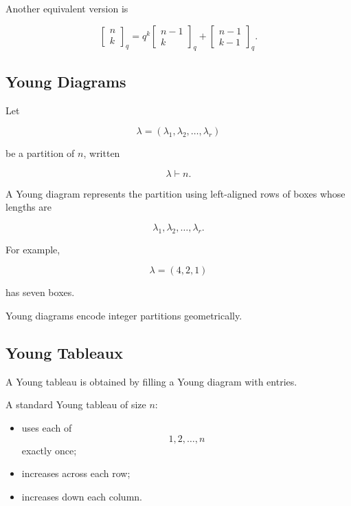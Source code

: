 Another equivalent version is

\[
\boxed{
\begin{bmatrix}
n\\
k
\end{bmatrix}_q
=
q^k
\begin{bmatrix}
n-1\\
k
\end{bmatrix}_q
+
\begin{bmatrix}
n-1\\
k-1
\end{bmatrix}_q.
}
\]

\subsection{Young Diagrams}
\label{subsec:young-diagrams-algebraic}

Let

\[
\lambda
=
(\lambda_1,\lambda_2,\ldots,\lambda_r)
\]

be a partition of \(n\), written

\[
\lambda\vdash n.
\]

A Young diagram represents the partition using left-aligned rows of
boxes whose lengths are

\[
\lambda_1,\lambda_2,\ldots,\lambda_r.
\]

For example,

\[
\lambda=(4,2,1)
\]

has seven boxes.

Young diagrams encode integer partitions geometrically.

\subsection{Young Tableaux}
\label{subsec:young-tableaux-algebraic}

A Young tableau is obtained by filling a Young diagram with entries.

A standard Young tableau of size \(n\):

\begin{itemize}
    \item uses each of
    \[
    1,2,\ldots,n
    \]
    exactly once;
    \item increases across each row;
    \item increases down each column.
\end{itemize}

